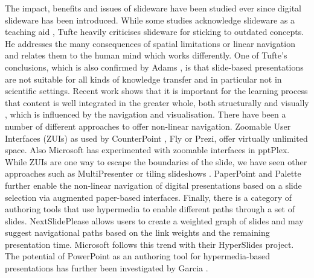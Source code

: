     The impact, benefits and issues of slideware have been studied ever since
    digital slideware has been introduced. While some studies acknowledge
    slideware as a teaching aid \citep{holzinger-1}, Tufte \citep{tufte-1}
    heavily criticises slideware for sticking to outdated concepts. He
    addresses the many consequences of spatial limitations or linear navigation
    and relates them to the human mind which works differently. One of Tufte's
    conclusions, which is also confirmed by Adams \citep{adams-1}, is that
    slide-based presentations are not suitable for all kinds of knowledge
    transfer and in particular not in scientific settings. Recent work shows
    that it is important for the learning process that content is well
    integrated in the greater whole, both structurally and visually
    \citep{gross-1}, which is influenced by the navigation and visualisation.
    There have been a number of different approaches to offer non-linear
    navigation. Zoomable User Interfaces (ZUIs) as used by CounterPoint
    \citep{good-1}, Fly \citep{lichtschlag-1} or Prezi, offer virtually
    unlimited space. Also Microsoft has experimented with zoomable interfaces
    in pptPlex. While ZUIs are one way to escape the boundaries of the slide,
    we have seen other approaches such as MultiPresenter \citep{lanir-1} or
    tiling slideshows \citep{chen-1}. PaperPoint \citep{signer-1} and Palette
    \citep{nelson-2} further enable the non-linear navigation of digital
    presentations based on a slide selection via augmented paper-based
    interfaces. Finally, there is a category of authoring tools that use
    hypermedia to enable different paths through a set of slides.
    NextSlidePlease \citep{spicer-1} allows users to create a weighted graph of
    slides and may suggest navigational paths based on the link weights and the
    remaining presentation time. Microsoft follows this trend with their
    HyperSlides \citep{edge-1} project. The potential of PowerPoint as an
    authoring tool for hypermedia-based presentations has further been
    investigated by Garcia \citep{garcia-1}.

